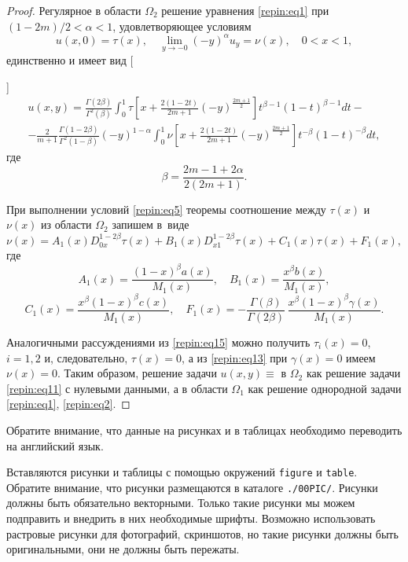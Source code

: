 \begin{proof}
Регулярное в области $\Omega_{2}$ решение уравнения \eqref{repin:eq1} при $({1-2m})/{2}< \alpha<1$, удовлетворяющее условиям
\begin{equation}
       \label{repin:eq11}
u(x, 0)= \tau(x), \quad \lim_{y \to -0} (-y)^{\alpha}u_{y}= \nu(x), \quad 0<x<1,
\end{equation}
единственно и имеет вид [{]
\begin{multline}
       \label{repin:eq12}
u(x,y)= \frac{\Gamma(2\beta)}{\Gamma^{2}(\beta)}  \int _{0}^{1} \tau \left[ x+ \frac{2(1-2t)}{2m+1} (-y)^{\frac{2m+1}{2}}\right]t^{\beta-1}(1-t)^{\beta-1}dt- \\
- \frac{2}{m+1} \frac{\Gamma(1-2\beta)}{\Gamma^{2}(1-\beta)} (-y)^{1-\alpha}  \int _{0}^{1} \nu \left[ x+ \frac{2(1-2t)}{2m+1} (-y)^{\frac{2m+1}{2}}\right]t^{-\beta}(1-t)^{-\beta}dt,
\end{multline}
где
\[
\beta=\frac{2m-1+2\alpha}{2(2m+1)}.
\]

При выполнении условий \eqref{repin:eq5} теоремы соотношение между $\tau(x)$ и $\nu(x)$ из области $\Omega_{2}$ запишем в~виде
\begin{equation}
       \label{repin:eq13}
\nu(x) =A_{1}(x) D_{0x}^{1-2\beta} \tau(x)+ B_{1}(x) D_{x1}^{1-2\beta} \tau(x)+ C_{1}(x) \tau(x) +F_{1}(x),
\end{equation}
где
\[
A_{1}(x)=\frac{(1-x)^{\beta} a(x)}{M_{1}(x)}, \quad B_{1}(x)=\frac{x^{\beta} b(x)}{M_{1}(x)},
\]
\[
C_{1}(x)=\frac{x^{\beta}(1-x)^{\beta} c(x)}{M_{1}(x)}, \quad F_{1}(x)=-\frac{\Gamma(\beta)}{\Gamma(2\beta)} \, \frac{x^{\beta}(1-x)^{\beta} \gamma(x)}{M_{1}(x)}.
\]



Аналогичными рассуждениями из \eqref{repin:eq15} можно получить $\tau_{i}(x)=0$, $i=1, 2$ и, следовательно, $\tau(x)=0$, а из \eqref{repin:eq13} при $\gamma(x)=0$ имеем $\nu(x)=0$. 
Таким образом, решение задачи $u(x,y) \equiv $ в $\Omega_{2}$ как решение задачи \eqref{repin:eq11} с нулевыми данными, а в области $\Omega_{1}$ как решение однородной задачи \eqref{repin:eq1}, \eqref{repin:eq2}.
}
\end{proof}

Обратите внимание, что  данные на рисунках и в таблицах необходимо переводить на английский язык. 

Вставляются рисунки и таблицы с помощью окружений {\tt figure} и {\tt table}. 
Обратите внимание, что рисунки размещаются в каталоге {\tt ./00PIC/}.
Рисунки должны быть обязательно векторными. 
Только такие рисунки мы можем подправить  и внедрить в них необходимые шрифты.
Возможно использовать растровые рисунки для фотографий, скриншотов, но такие рисунки должны быть оригинальными, они не должны быть пережаты.

